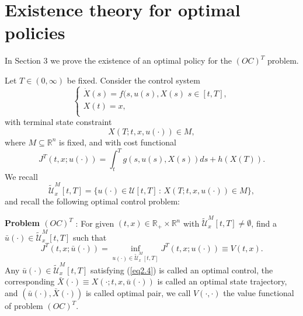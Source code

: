 \section{Existence theory for optimal policies}
    In Section 3 we prove the existence of an optimal policy for the $(OC)^T$
    problem.
    
    Let $T\in (0,\infty)$ be fixed. Consider the control system 
    $$\left\{ \begin{array}{l}
    	\dot{X}(s)=f(s,u(s),X(s)\,\,s\in [t,T], \\
    	X(t)=x,\\
    \end{array}
    \right.
    $$
    with terminal state constraint
    $$
        X(T;t,x,u(\cdot))\in M,
    $$
    where $M\subseteq \mathbb{R}^n$ is fixed, and with cost functional
    \begin{equation*}
        J^T(t,x;u(\cdot))=\int_{t}^{T}g(s,u(s),X(s)) ds + h(X(T)).
    \end{equation*}
    We recall 
    $$
        \tilde{\mathcal{U}}^M_x[t,T] = %
            \{u(\cdot)\in\mathcal{U}[t,T] \, : \, X(T;t,x,u(\cdot))\in M\},
    $$
    and recall the following optimal control problem:

    \textbf{Problem $(OC)^T$} : For given $(t,x)\in \mathbb{R}_{+}\times \mathbb{R}^n$ 
    with $\tilde{\mathcal{U}}^M_x[t,T]\neq\emptyset$, find a $\bar{u}(\cdot) \in %
    \tilde{\mathcal{U}}^M_x[t,T]$ such that
    \begin{equation}\label{eq2.4} 
        J^T(t,x;\bar{u}(\cdot))=\inf_{u(\cdot)\in \tilde{\mathcal{U}}^M_x[t,T]} %
        J^T(t,x;u(\cdot))\equiv V(t,x).
    \end{equation}
    Any $\bar{u}(\cdot)\in \tilde{\mathcal{U}}^M_x[t,T]$ satisfying (\cref{eq2.4}) 
    is called an optimal control, the corresponding $\bar{X}(\cdot)\equiv %
    X(\cdot;t,x,\bar{u}(\cdot))$ is called an optimal state trajectory, and %
    $(\bar{u}(\cdot),\bar{X}(\cdot))$ is called optimal pair, we call $V(\cdot,\cdot)$ %
    the value functional of problem $(OC)^T$.

